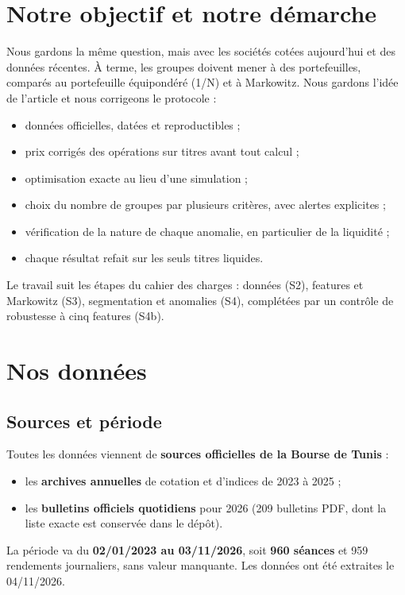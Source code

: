 \documentclass[11pt,a4paper]{article}
\begin{document}
\section{Notre objectif et notre démarche}\label{sec:notre-objectif}
Nous gardons la même question, mais avec les sociétés cotées aujourd'hui et des données récentes. À terme, les groupes doivent mener à des portefeuilles, comparés au portefeuille équipondéré (1/N) et à Markowitz. Nous gardons l'idée de l'article et nous corrigeons le protocole :
\begin{itemize}
  \item données officielles, datées et reproductibles ;
  \item prix corrigés des opérations sur titres avant tout calcul ;
  \item optimisation exacte au lieu d'une simulation ;
  \item choix du nombre de groupes par plusieurs critères, avec alertes explicites ;
  \item vérification de la nature de chaque anomalie, en particulier de la liquidité ;
  \item chaque résultat refait sur les seuls titres liquides.
\end{itemize}
Le travail suit les étapes du cahier des charges : données (S2), features et Markowitz (S3), segmentation et anomalies (S4), complétées par un contrôle de robustesse à cinq features (S4b).

\section{Nos données}\label{sec:donnees}
\subsection{Sources et période}
Toutes les données viennent de \textbf{sources officielles de la Bourse de Tunis} :
\begin{itemize}
  \item les \textbf{archives annuelles} de cotation et d'indices de 2023 à 2025 ;
  \item les \textbf{bulletins officiels quotidiens} pour 2026 (209 bulletins PDF, dont la liste exacte est conservée dans le dépôt).
\end{itemize}
La période va du \textbf{02/01/2023 au 03/11/2026}, soit \textbf{960 séances} et 959 rendements journaliers, sans valeur manquante. Les données ont été extraites le 04/11/2026.
\end{document}
